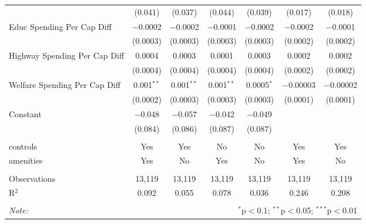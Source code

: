 \begin{table}[!htbp]
\begin{tabular}{@{\extracolsep{5pt}}lcccccc}
  & (0.041) & (0.037) & (0.044) & (0.039) & (0.017) & (0.018) \\ 
  Educ Spending Per Cap Diff & $-$0.0002 & $-$0.0002 & $-$0.0001 & $-$0.0002 & $-$0.0002 & $-$0.0001 \\ 
  & (0.0003) & (0.0003) & (0.0003) & (0.0003) & (0.0002) & (0.0002) \\ 
  Highway Spending Per Cap Diff & 0.0004 & 0.0003 & 0.0001 & 0.0003 & 0.0002 & 0.0002 \\ 
  & (0.0004) & (0.0004) & (0.0004) & (0.0004) & (0.0002) & (0.0002) \\ 
  Welfare Spending Per Cap Diff & 0.001$^{**}$ & 0.001$^{**}$ & 0.001$^{**}$ & 0.0005$^{*}$ & $-$0.00003 & $-$0.00002 \\ 
  & (0.0002) & (0.0003) & (0.0003) & (0.0003) & (0.0001) & (0.0001) \\ 
  Constant & $-$0.048 & $-$0.057 & $-$0.042 & $-$0.049 &  &  \\ 
  & (0.084) & (0.086) & (0.087) & (0.087) &  &  \\ 
 \hline \\[-1.8ex] 
controls & Yes & Yes & No & No & Yes & Yes \\ 
amenities & Yes & No & Yes & No & Yes & No \\ 
\hline \\[-1.8ex] 
Observations & 13,119 & 13,119 & 13,119 & 13,119 & 13,119 & 13,119 \\ 
R$^{2}$ & 0.092 & 0.055 & 0.078 & 0.036 & 0.246 & 0.208 \\ 
\hline 
\hline \\[-1.8ex] 
\textit{Note:}  & \multicolumn{6}{r}{$^{*}$p$<$0.1; $^{**}$p$<$0.05; $^{***}$p$<$0.01} \\ 
\end{tabular} 
\end{table} 
